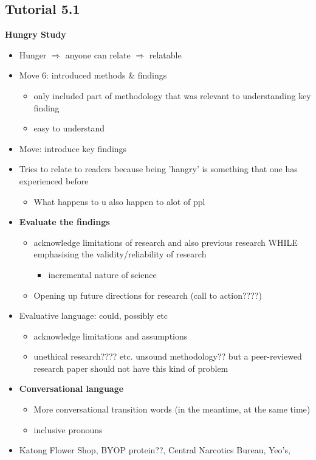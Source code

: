 \documentclass{article}
\begin{document}
\begin{multicols}{2}
\subsection{Tutorial 5.1}
\textbf{Hungry Study}
\begin{itemize}
	\item Hunger $\Rightarrow$ anyone can relate $\Rightarrow$ relatable
	\item Move 6: introduced methods \& findings
	\begin{itemize}
		\item only included part of methodology that was relevant to understanding key finding
		\item easy to understand
	\end{itemize}
	\item Move: introduce key findings
	\item Tries to relate to readers because being 'hangry' is something that one has experienced before
	\begin{itemize}
		\item What happens to u also happen to alot of ppl
	\end{itemize}
    \item \textbf{Evaluate the findings}
    \begin{itemize}
    	\item acknowledge limitations of research and also previous research WHILE emphasising the validity/reliability of research
    	\begin{itemize}
    		\item incremental nature of science
    	\end{itemize}
    	\item Opening up future directions for research (call to action????)
    \end{itemize}
    \item Evaluative language: could, possibly etc
    \begin{itemize}
    	\item acknowledge limitations and assumptions
    	\item unethical research???? etc. unsound methodology?? but a peer-reviewed research paper should not have this kind of problem
    \end{itemize}
    \item \textbf{Conversational language}
    \begin{itemize}
    	\item More conversational transition words (in the meantime, at the same time)
    	\item inclusive pronouns
    \end{itemize}
    \item Katong Flower Shop, BYOP protein??, Central Narcotics Bureau, Yeo's,  %
\end{itemize}

\end{multicols}
\end{document}
